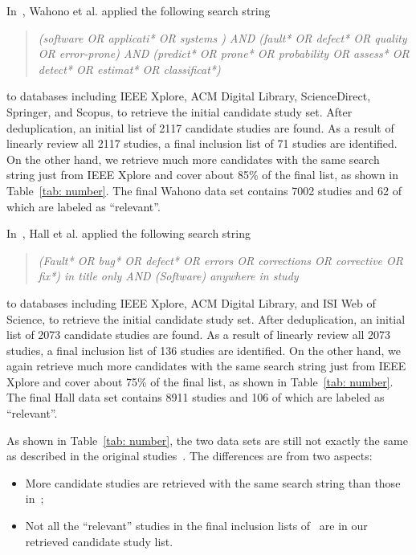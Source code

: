 \documentclass{svjour3}
\theoremstyle{break}
\begin{document}
In~\cite{wahono2015systematic}, Wahono et al. applied the following search string
\begin{quote}\textit{(software OR applicati* OR systems ) AND (fault* OR
defect* OR quality OR error-prone) AND (predict*
OR prone* OR probability OR assess* OR detect* OR
estimat* OR classificat*)}
\end{quote}
to databases including IEEE Xplore, ACM Digital Library, ScienceDirect, Springer, and Scopus, to retrieve the initial candidate study set. After deduplication, an initial list of 2117 candidate studies are found. As a result of linearly review all 2117 studies, a final inclusion list of 71 studies are identified. On the other hand, we retrieve much more candidates with the same search string just from IEEE Xplore and cover about 85\% of the final list, as shown in Table~\ref{tab: number}. The final Wahono data set contains 7002 studies and 62 of which are labeled as ``relevant''.

In~\cite{hall2012systematic}, Hall et al. applied the following search string
\begin{quote}{\em (Fault* OR bug* OR defect* OR errors OR corrections OR corrective OR fix*) \textit{in title only}
AND (Software) \textit{anywhere in study} }
\end{quote}
to databases including IEEE Xplore, ACM Digital Library, and ISI Web of Science, to retrieve the initial candidate study set. After deduplication, an initial list of 2073 candidate studies are found. As a result of linearly review all 2073 studies, a final inclusion list of 136 studies are identified. On the other hand, we again retrieve much more candidates with the same search string just from IEEE Xplore and cover about 75\% of the final list, as shown in Table~\ref{tab: number}. The final Hall data set contains 8911 studies and 106 of which are labeled as ``relevant''.

As shown in Table~\ref{tab: number}, the two data sets are still not exactly the same as described in the original studies~\cite{wahono2015systematic,hall2012systematic}. The differences are from two aspects: 

\begin{itemize}

\item
More candidate studies are retrieved with the same search string than those in~\cite{wahono2015systematic,hall2012systematic};

\item
Not all the ``relevant'' studies in the final inclusion lists of~\cite{wahono2015systematic,hall2012systematic} are in our retrieved candidate study list.

\end{itemize}
\end{document}
